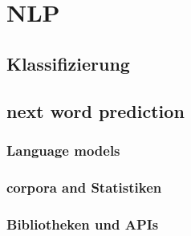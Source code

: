 \section{NLP}

	\subsection{Klassifizierung}
	\subsection{next word prediction}
		\subsubsection{Language models}
		\subsubsection{corpora and Statistiken}
		\subsubsection{Bibliotheken und APIs}